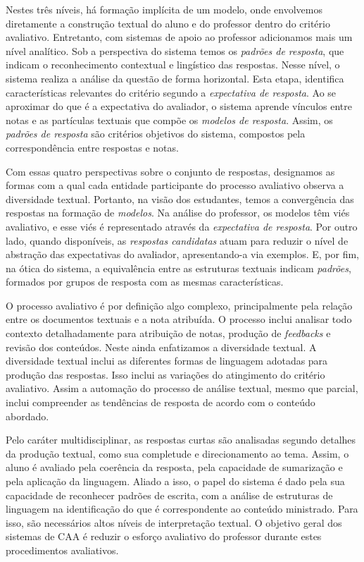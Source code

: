 Nestes três níveis, há formação implícita de um modelo, onde envolvemos diretamente a construção textual do aluno e do professor dentro do critério avaliativo. Entretanto, com sistemas de apoio ao professor adicionamos mais um nível analítico. Sob a perspectiva do sistema temos os \textit{padrões de resposta}, que indicam o reconhecimento contextual e lingístico das respostas. Nesse nível, o sistema realiza a análise da questão de forma horizontal. Esta etapa, identifica características relevantes do critério segundo a \textit{expectativa de resposta}. Ao se aproximar do que é a expectativa do avaliador, o sistema aprende vínculos entre notas e as partículas textuais que compõe os \textit{modelos de resposta}. Assim, os \textit{padrões de resposta} são critérios objetivos do sistema, compostos pela correspondência entre respostas e notas.

Com essas quatro perspectivas sobre o conjunto de respostas, designamos as formas com a qual cada entidade participante do processo avaliativo observa a diversidade textual. Portanto, na visão dos estudantes, temos a convergência das respostas na formação de \textit{modelos}. Na análise do professor, os modelos têm viés avaliativo, e esse viés é representado através da \textit{expectativa de resposta}. Por outro lado, quando disponíveis, as \textit{respostas candidatas} atuam para reduzir o nível de abstração das expectativas do avaliador, apresentando-a via exemplos.  E, por fim, na ótica do sistema, a equivalência entre as estruturas textuais indicam \textit{padrões}, formados por grupos de resposta com as mesmas características.

O processo avaliativo é por definição algo complexo, principalmente pela relação entre os documentos textuais e a nota atribuída. O processo inclui analisar todo contexto detalhadamente para atribuição de notas, produção de \textit{feedbacks} e revisão dos conteúdos. Neste ainda enfatizamos a diversidade textual. A diversidade textual inclui as diferentes formas de linguagem adotadas para produção das respostas. Isso inclui as variações do atingimento do critério avaliativo. Assim a automação do processo de análise textual, mesmo que parcial, inclui compreender as tendências de resposta de acordo com o conteúdo abordado. 

Pelo caráter multidisciplinar, as respostas curtas são analisadas segundo detalhes da produção textual, como sua completude e direcionamento ao tema. Assim, o aluno é avaliado pela coerência da resposta, pela capacidade de sumarização e pela aplicação da linguagem. Aliado a isso, o papel do sistema é dado pela sua capacidade de reconhecer padrões de escrita, com a análise de estruturas de linguagem na identificação do que é correspondente ao conteúdo ministrado. Para isso, são necessários altos níveis de interpretação textual. O objetivo geral dos sistemas de CAA é reduzir o esforço avaliativo do professor durante estes procedimentos avaliativos. 

